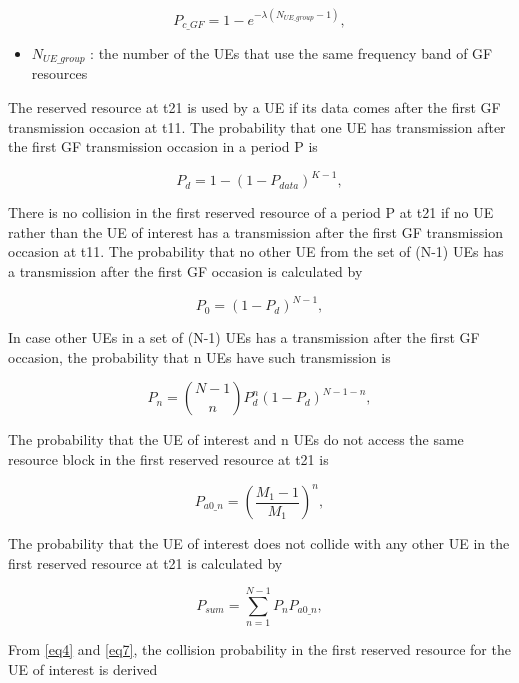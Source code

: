 \documentclass[conference]{IEEEtran}
\begin{document}
\begin{equation}
P_{c\_GF} = 1 - e^{-\lambda(N_{UE\_group}-1)},\label{eq2}
\end{equation}
\begin{itemize}
    \item $N_{UE\_group}$ : the number of the UEs that use the same frequency band of GF resources
\end{itemize}

The reserved resource at t21 is used by a UE if its data comes after the first GF transmission occasion at t11. The probability that one UE has transmission after the first GF transmission occasion in a period P is

\begin{equation}
P_{d} = 1 - (1-P_{data})^{K-1},\label{eq3}
\end{equation}

There is no collision in the first reserved resource of a period P at t21 if no UE rather than the UE of interest has a transmission after the first GF transmission occasion at t11. The probability that no other UE from the set of (N-1) UEs has a transmission after the first GF occasion is calculated by

\begin{equation}
P_{0} = (1-P_{d})^{N-1},\label{eq4}
\end{equation}

In case other UEs in a set of (N-1) UEs has a transmission after the first GF occasion, the probability that n UEs have such transmission is

\begin{equation}
P_{n} = \binom {N-1}{n}P_{d}^{n}(1-P_{d})^{N-1-n},\label{eq5}
\end{equation}

The probability that the UE of interest and n UEs do not access the same resource block in the first reserved resource at t21 is

\begin{equation}
P_{a0\_n} = (\frac {M_{1}-1}{M_{1}})^{n},\label{eq6}
\end{equation}

The probability that the UE of interest does not collide with any other UE in the first reserved resource at t21 is calculated by

\begin{equation}
P_{sum} = \sum_{n=1}^{N-1} P_{n}P_{a0\_n},\label{eq7}
\end{equation}

From \eqref{eq4} and \eqref{eq7}, the collision probability in the first reserved resource for the UE of interest is derived
\end{document}
